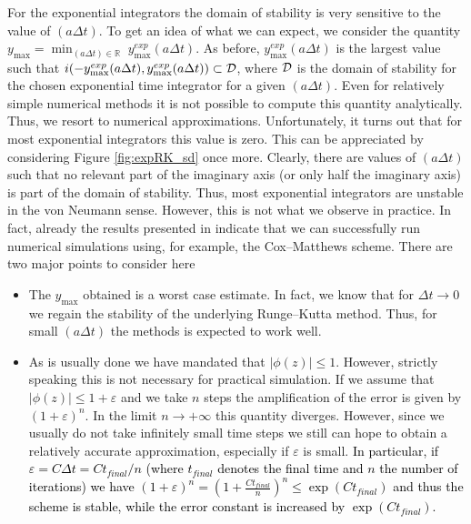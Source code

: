 For the exponential integrators the domain of stability is very sensitive to the value of $(a\Delta t)$. To get an idea of what we can expect, we consider the quantity $y_{\max} = \min_{(a\Delta t)\in\mathbb{R}} \; y^{exp}_{\max}(a \Delta t)$. As before, $y^{exp}_{\max}(a\Delta t)$ is the largest value such that $i(-y^{exp}_{\max}(a\Delta t), y^{exp}_{\max}(a\Delta t))\subset {\cal D}$, where ${\cal D}$ is the domain of stability for the chosen exponential time integrator for a given $(a\Delta t)$. 
Even for relatively simple numerical methods it is not possible to compute this quantity analytically. Thus, we resort to numerical approximations. Unfortunately, it turns out that for most exponential integrators this value is zero. This can be appreciated by considering Figure \ref{fig:expRK_sd} once more. Clearly, there are values of $(a \Delta t)$ such that no relevant part of the imaginary axis (or only half the imaginary axis) is part of the domain of stability.
Thus, most exponential integrators are unstable in the von Neumann sense. However, this is not what we observe in practice. In fact, already the results presented in \cite{Crouseilles:2018} indicate that we can successfully run numerical simulations using, for example, the Cox--Matthews scheme. There are two major points to consider here
\begin{itemize}
    \item The $y_{\max}$ obtained is a worst case estimate. In fact, we know that for $\Delta t \to 0$ we regain the stability of the underlying Runge--Kutta method. Thus, for small $(a \Delta t)$ the methods is expected to work well.
    \item As is usually done we have mandated that $\vert \phi(z) \vert \leq 1$. However, strictly speaking this is not necessary for practical simulation. If we assume that $\vert \phi(z) \vert \leq 1+\varepsilon$ and we take $n$ steps the amplification of the error is given by $(1+\varepsilon)^n$. In the limit $n \to +\infty$ this quantity diverges. However, since we usually do not take infinitely small time steps we still can hope to obtain a relatively accurate approximation, especially if $\varepsilon$ is small. \textcolor{black}{In particular, if $\varepsilon = C \Delta t = C t_{final}/n$ (where $t_{final}$ denotes the final time and $n$ the number of iterations) we have $(1+\varepsilon)^n = (1+\tfrac{C t_{final}}{n} )^n \leq \exp(C t_{final})$ and thus the scheme is stable, while the error constant is increased by $\exp(C t_{final})$.}
\end{itemize}


